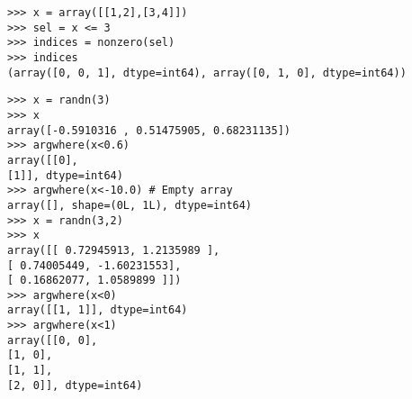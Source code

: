 \documentclass[KSmain.tex]{subfiles}
\begin{document}
\begin{framed}
\begin{verbatim}
>>> x = array([[1,2],[3,4]])
>>> sel = x <= 3
>>> indices = nonzero(sel)
>>> indices
(array([0, 0, 1], dtype=int64), array([0, 1, 0], dtype=int64))
\end{verbatim}
\end{framed}

\begin{framed}
\begin{verbatim}
>>> x = randn(3)
>>> x
array([-0.5910316 , 0.51475905, 0.68231135])
>>> argwhere(x<0.6)
array([[0],
[1]], dtype=int64)
>>> argwhere(x<-10.0) # Empty array
array([], shape=(0L, 1L), dtype=int64)
>>> x = randn(3,2)
>>> x
array([[ 0.72945913, 1.2135989 ],
[ 0.74005449, -1.60231553],
[ 0.16862077, 1.0589899 ]])
>>> argwhere(x<0)
array([[1, 1]], dtype=int64)
>>> argwhere(x<1)
array([[0, 0],
[1, 0],
[1, 1],
[2, 0]], dtype=int64)

\end{verbatim}
\end{framed}
\end{document}
